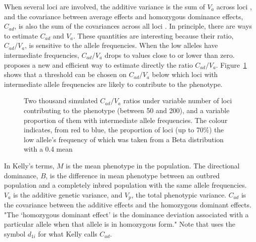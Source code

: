 \documentclass[a4paper,12pt]{article}
\begin{document}
When several loci are involved, the additive variance is the sum of $V_a$ across loci \citep[p. 129]{Falconer1989}, and the covariance between average effects and homozygous dominance effects, $C_{ad}$, is also the sum of the covariances across all loci \citep{Cockerham1984}. In principle, there are ways to estimate $C_{ad}$ and $V_a$. These quantities are interesting because their ratio, $C_{ad}/V_a$, is sensitive to the allele frequencies. When the low alleles have intermediate frequencies, $C_{ad}/V_a$ drops to values close to or lower than zero. \citet{Kelly1999} proposes a new and efficient way to estimate directly the ratio $C_{ad}/V_a$. Figure~\ref{fig:ratio} shows that a threshold can be chosen on $C_{ad}/V_a$ below which loci with intermediate allele frequencies are likely to contribute to the phenotype.

\begin{figure}
\caption{Two thousand simulated $C_{ad}/V_a$ ratios under variable number of loci contributing to the phenotype (between 50 and 200), and a variable proportion of them with intermediate allele frequencies. The colour indicates, from red to blue, the proportion of loci (up to 70\%) the low allele's frequency of which was taken from a Beta distribution with a 0.4 mean}\label{fig:ratio}
\end{figure}

In Kelly's terms, $M$ is the mean phenotype in the population. The directional dominance, $B$, is the difference in mean phenotype between an outbred population and a completely inbred population with the same allele frequencies. $V_a$ is the additive genetic variance, and $V_p$, the total phenotypic variance. $C_{ad}$ is the covariance between the additive effects and the homozygous dominant effects. "The `homozygous dominant effect' is the dominance deviation associated with a particular allele when that allele is in homozygous form." Note that \citet{Cockerham1984} uses the symbol $d_{1i}$ for what Kelly calls $C_{ad}$.
\end{document}
